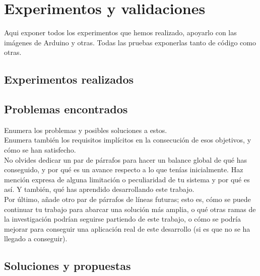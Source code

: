 \chapter{Experimentos y validaciones}
\label{cap:capitulo4}

Aqui exponer todos los experimentos que hemos realizado, apoyarlo con las imágenes de Arduino y otras. Todas las pruebas exponerlas tanto de código como otras.
\vspace{0.45cm}

\section{Experimentos realizados}

\section{Problemas encontrados}

Enumera los problemas y posibles soluciones a estos.\\

Enumera también los requisitos implícitos en la consecución de esos objetivos, y cómo se han satisfecho.\\

No olvides dedicar un par de párrafos para hacer un balance global de qué has conseguido, y por qué es un avance respecto a lo que tenías inicialmente. Haz mención expresa de alguna limitación o peculiaridad de tu sistema y por qué es así. Y también, qué has aprendido desarrollando este trabajo.\\

Por último, añade otro par de párrafos de líneas futuras; esto es, cómo se puede continuar tu trabajo para abarcar una solución más amplia, o qué otras ramas de la investigación podrían seguirse partiendo de este trabajo, o cómo se podría mejorar para conseguir una aplicación real de este desarrollo (si es que no se ha llegado a conseguir).

\section{Soluciones y propuestas}
